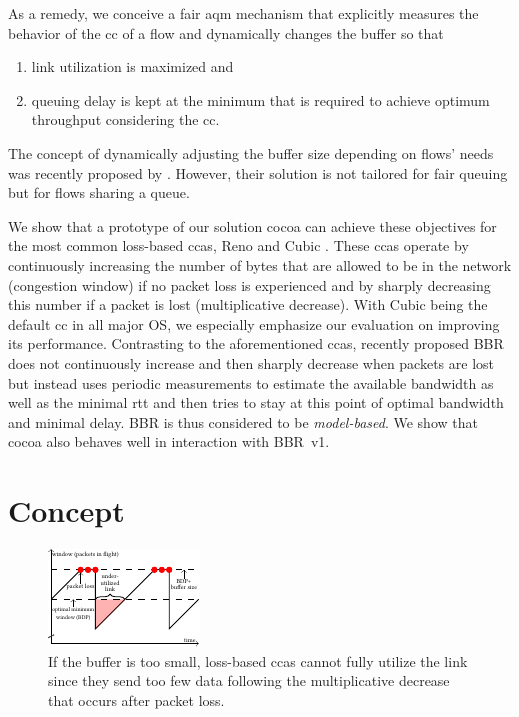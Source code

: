 \documentclass[10pt,sigconf,letterpaper,dvipsnames\ifx\removeHeaders\tempYes ,nonacm\fi]{acmart}
\begin{document}
As a remedy, we conceive a fair \gls{aqm} mechanism that explicitly measures the behavior of the \gls{cc} of a flow and dynamically changes the buffer so that 
\begin{enumerate}[topsep=0pt,wide,labelwidth=!,labelindent=0pt]
\item link utilization is maximized and
\item queuing delay is kept at the minimum that is required to achieve optimum throughput considering the \gls{cc}.
\end{enumerate}
The concept of dynamically adjusting the buffer size depending on flows' needs was recently proposed by \cite{bless_policy-oriented_2018}. However, their solution is not tailored for fair queuing but for flows sharing a queue. 

We show that a prototype of our solution \gls{cocoa} can achieve these objectives for the most common loss-based \glspl{cca}, Reno \cite {jacobson_congestion_1988} and Cubic \cite{ha_cubic:_2008}. These \glspl{cca} operate by continuously increasing the number of bytes that are allowed to be in the network (congestion window) if no packet loss is experienced and by sharply decreasing this number if a packet is lost (multiplicative decrease). With Cubic being the default \gls{cc} in all major OS, we especially emphasize our evaluation on improving its performance. Contrasting to the aforementioned \glspl{cca}, recently proposed BBR \cite{cardwell_bbr:_2016} does not continuously increase and then sharply decrease when packets are lost but instead uses periodic measurements to estimate the available bandwidth as well as the minimal \gls{rtt} and then tries to stay at this point of optimal bandwidth and minimal delay. BBR is thus considered to be \textit{model-based}. We show that \gls{cocoa} also behaves well in interaction with BBR~v1.

\section{Concept}

\begin{figure}[h]
\includegraphics[width=\columnwidth]{figures/cocoa_illustration_too_little.pdf}
\caption{If the buffer is too small, loss-based \glspl{cca} cannot fully utilize the link since they send too few data following the multiplicative decrease that occurs after packet loss.}
\label{fig:tooLittle}
\end{figure}
\end{document}
